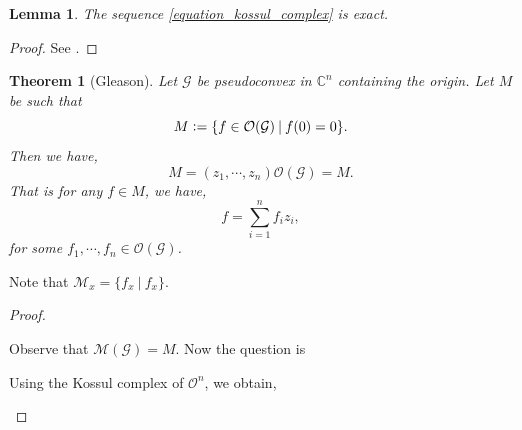 \documentclass{article}
\newtheorem{theorem}{Theorem} [section]
\newtheorem{lemma}{Lemma}[section]
\newcommand{\defeq}{\vcentcolon=}
\newcommand{\C}[0]{\mathbb{C}}
\newcommand{\G}[0]{\mathcal{G}}
\newcommand{\sep}[0]{\:|\:}
\newcommand{\Ouv}[0]{\mathcal{O}}
\begin{document}
\begin{lemma}
  The sequence \eqref{equation_kossul_complex} is exact. 
\end{lemma}
\begin{proof}
  See \cite{Gr-Ra}.
\end{proof}
\begin{theorem}[Gleason]
  Let $\G$ be pseudoconvex in $\C^n$ containing the origin. Let $M$ be such that 
  \begin{equation*}
    M \defeq \{f\in\Ouv(\G)\sep f(0)=0\}.
  \end{equation*}
  Then we have, 
  \begin{equation*}
    M = (z_1,\cdots,z_n)\Ouv(\G) = M.
  \end{equation*}
  That is for any $f\in M$, we have,
  \begin{equation*}
    f=\sum_{i=1}^n f_iz_i,
  \end{equation*}
  for some $f_1,\cdots,f_n\in\Ouv(\G)$.
\end{theorem}
Note that $\mathcal{M}_x = \{f_x\sep f_x\}$.
\begin{proof}
  \begin{center}
  \end{center}
  Observe that $\mathcal{M}(\G)=M$. Now the question is 
  \begin{center}
  \end{center} 
  Using the Kossul complex of $\Ouv^n$, we obtain,
  \begin{center}
  \end{center}
\end{proof}
\end{document}
